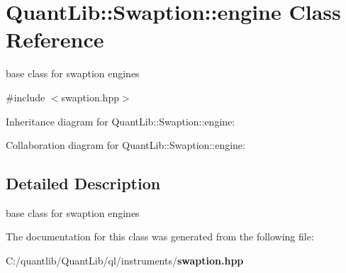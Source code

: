 \section{Quant\+Lib\+:\+:Swaption\+:\+:engine Class Reference}
\label{class_quant_lib_1_1_swaption_1_1engine}


base class for swaption engines  




{\ttfamily \#include $<$swaption.\+hpp$>$}



Inheritance diagram for Quant\+Lib\+:\+:Swaption\+:\+:engine\+:


Collaboration diagram for Quant\+Lib\+:\+:Swaption\+:\+:engine\+:


\subsection{Detailed Description}
base class for swaption engines 

The documentation for this class was generated from the following file\+:\begin{DoxyCompactItemize}
\item 
C\+:/quantlib/\+Quant\+Lib/ql/instruments/{\bf swaption.\+hpp}\end{DoxyCompactItemize}
